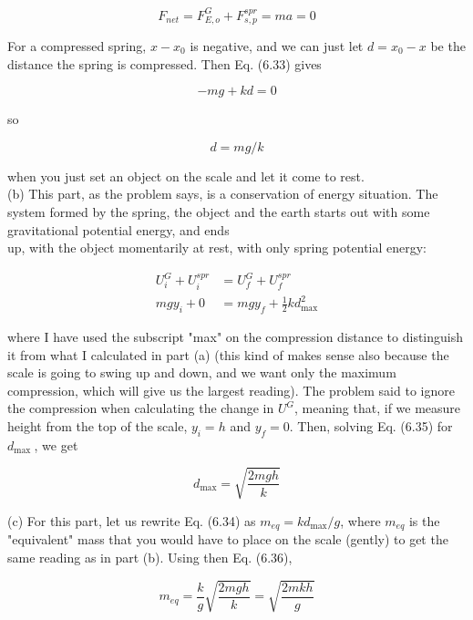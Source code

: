 \documentclass[10pt]{article}
\begin{document}
\begin{equation*}
F_{n e t}=F_{E, o}^{G}+F_{s, p}^{s p r}=m a=0 \tag{6.33}
\end{equation*}


For a compressed spring, $x-x_{0}$ is negative, and we can just let $d=x_{0}-x$ be the distance the spring is compressed. Then Eq. (6.33) gives

$$
-m g+k d=0
$$

so


\begin{equation*}
d=m g / k \tag{6.34}
\end{equation*}


when you just set an object on the scale and let it come to rest.\\
(b) This part, as the problem says, is a conservation of energy situation. The system formed by the spring, the object and the earth starts out with some gravitational potential energy, and ends\\
up, with the object momentarily at rest, with only spring potential energy:


\begin{align*}
U_{i}^{G}+U_{i}^{s p r} & =U_{f}^{G}+U_{f}^{s p r} \\
m g y_{i}+0 & =m g y_{f}+\frac{1}{2} k d_{\max }^{2} \tag{6.35}
\end{align*}


where I have used the subscript "max" on the compression distance to distinguish it from what I calculated in part (a) (this kind of makes sense also because the scale is going to swing up and down, and we want only the maximum compression, which will give us the largest reading). The problem said to ignore the compression when calculating the change in $U^{G}$, meaning that, if we measure height from the top of the scale, $y_{i}=h$ and $y_{f}=0$. Then, solving Eq. (6.35) for $d_{\text {max }}$, we get


\begin{equation*}
d_{\max }=\sqrt{\frac{2 m g h}{k}} \tag{6.36}
\end{equation*}


(c) For this part, let us rewrite Eq. (6.34) as $m_{e q}=k d_{\max } / g$, where $m_{e q}$ is the "equivalent" mass that you would have to place on the scale (gently) to get the same reading as in part (b). Using then Eq. (6.36),


\begin{equation*}
m_{e q}=\frac{k}{g} \sqrt{\frac{2 m g h}{k}}=\sqrt{\frac{2 m k h}{g}} \tag{6.37}
\end{equation*}
\end{document}
